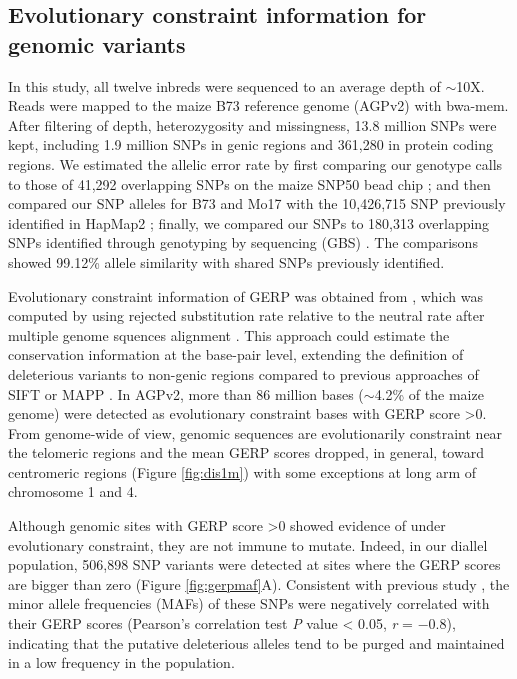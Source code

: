 \documentclass[9pt,twocolumn,twoside]{gsajnl}
\begin{document}
\subsection*{Evolutionary constraint information for genomic variants}

In this study, all twelve inbreds were sequenced to an average depth of $\sim$10X. Reads were mapped to the maize B73 reference genome (AGPv2) with bwa-mem. After filtering of depth, heterozygosity and missingness, 13.8 million SNPs were kept, including 1.9 million SNPs in genic regions and 361,280 in protein coding regions. We estimated the allelic error rate by first comparing our genotype calls to those of 41,292 overlapping SNPs on the maize SNP50 bead chip \citep{Heerwaarden2012}; and then compared our SNP alleles for B73 and Mo17 with the 10,426,715 SNP previously identified in HapMap2 \citep{Chia2012}; finally, we compared our SNPs to 180,313 overlapping SNPs identified through genotyping by sequencing (GBS) \citep{Romay2013}. The comparisons showed 99.12\% allele similarity with shared SNPs previously identified.  

Evolutionary constraint information of GERP was obtained from \citep{rodgers2015recombination}, which was computed by using rejected substitution rate relative to the neutral rate after multiple genome squences alignment \citep{Davydov2010}. This approach could estimate the conservation information at the base-pair level, extending the definition of deleterious variants to non-genic regions compared to previous approaches of SIFT \citep{ng2003sift} or MAPP \citep{stone2005physicochemical}. In AGPv2, more than 86 million bases ($\sim$4.2\% of the maize genome) were detected as evolutionary constraint bases with GERP score >0. From genome-wide of view, genomic sequences are evolutionarily constraint near the telomeric regions and the mean GERP scores dropped, in general, toward centromeric regions (Figure \ref{fig:dis1m}) with some exceptions at long arm of chromosome 1 and 4.  

Although genomic sites with GERP score >0 showed evidence of under evolutionary constraint, they are not immune to mutate. Indeed, in our diallel population, 506,898 SNP variants were detected at sites where the GERP scores are bigger than zero (Figure \ref{fig:gerpmaf}A). Consistent with previous study \citep{rodgers2015recombination}, the minor allele frequencies (MAFs) of these SNPs were negatively correlated with their GERP scores (Pearson's correlation test \emph{P} value < 0.05, \emph{r} = $-0.8$), indicating that the putative deleterious alleles tend to be purged and maintained in a low frequency in the population. 
\end{document}
